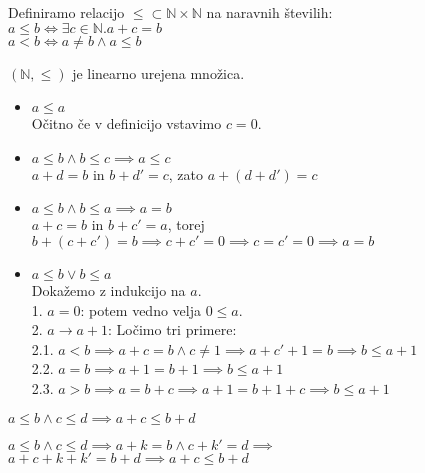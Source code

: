 \begin{definicija}
    Definiramo relacijo $\leq \subset \mathbb{N} \times \mathbb{N}$ na naravnih številih: \\
    $a \leq b \iff \exists c \in \mathbb{N}. a + c = b$ \\
    $a < b \iff a \neq b \wedge a \leq b$
\end{definicija}

\begin{trditev}
    $(\mathbb{N}, \leq)$ je linearno urejena množica.
\end{trditev}
\begin{dokaz}
    \begin{itemize}
        \item $a \leq a$ \\
        Očitno če v definicijo vstavimo $c = 0$.
        \item $a \leq b \wedge b \leq c \implies a \leq c$ \\
        $a + d = b$ in $b + d' = c$, zato $a + (d + d') = c$
        \item $a \leq b \wedge b \leq a \implies a = b$ \\
        $a + c = b$ in $b + c' = a$, torej $b + (c + c') = b \implies c + c' = 0 \implies c = c' = 0 \implies a = b$
        \item $a \leq b \vee b \leq a$ \\
        Dokažemo z indukcijo na $a$. \\
        1. $a = 0$: potem vedno velja $0 \leq a$. \\
        2. $a \to a + 1$: Ločimo tri primere: \\
        2.1. $a < b \implies a + c = b \wedge c \neq 1 \implies a + c' + 1 = b \implies b \leq a + 1$ \\
        2.2. $a = b \implies a + 1 = b + 1 \implies b \leq a + 1$ \\
        2.3. $a > b \implies a = b + c \implies a + 1 = b + 1 + c \implies b \leq a + 1$
    \end{itemize}
\end{dokaz}

\begin{trditev}
    $a \leq b \wedge c \leq d \implies a + c \leq b + d$
\end{trditev}
\begin{dokaz}
    $a \leq b \wedge c \leq d \implies a + k = b \wedge c + k' = d \implies$
    $a + c + k + k' = b + d \implies a + c \leq b + d$
\end{dokaz}

